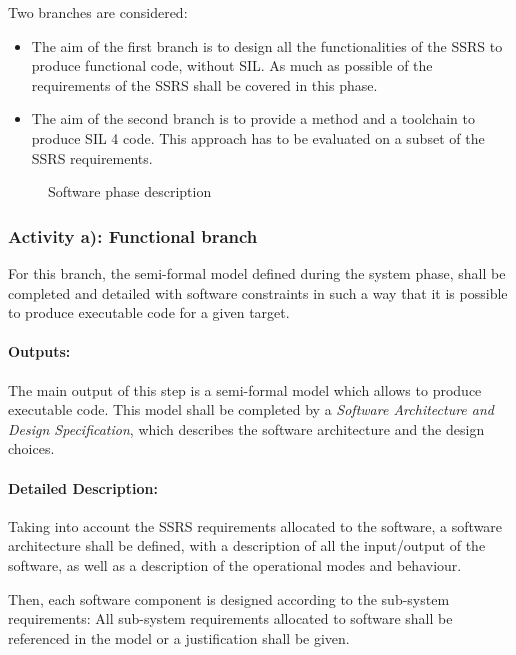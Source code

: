 Two branches are considered:
\begin{itemize}
\item  The aim of the first branch  is to  design all the functionalities of the SSRS to  produce functional code, without SIL. As much as possible of the requirements of the SSRS shall be covered in this phase.
\item The aim  of the second branch is to provide a method and a toolchain to produce SIL 4 code. This approach has to be evaluated on a subset of the SSRS requirements.
\end{itemize}


\begin{figure}[h]
  \centering
  \caption{Software phase description}
  \label{fig:detailed software}
\end{figure}


\subsubsection{Activity a): Functional branch}
\label{sec:sw-func}

For this branch, the semi-formal model  defined during the system phase, shall  be completed and detailed with software constraints in such a way that it is possible to produce executable code for a given target.


\paragraph{Outputs:}
\label{sec:sw-func_out}

The main output of this step  is a semi-formal model which  allows to produce executable code.
This model  shall be completed by a \textit{Software Architecture and Design Specification}, which describes the software architecture and the design choices.


\paragraph{Detailed Description:}
\label{sec:sw-req-deta-descr}

Taking into account the SSRS requirements allocated to  the software, a software architecture shall be defined, with a description of all the input/output of the software, as well as a description of the operational modes and behaviour.

Then, each software component is designed according to  the sub-system  requirements: All sub-system requirements allocated to  software shall be referenced in the model or a justification shall be given.

